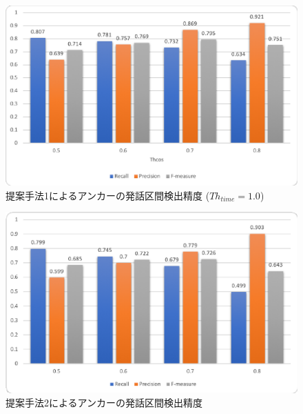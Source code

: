 \begin{figure}[H]
  \begin{center}
    \includegraphics[scale=0.8]{./figure/get_anchor_prob1.eps}
  \end{center}
  \caption{提案手法1によるアンカーの発話区間検出精度 ($Th_{time}=1.0$) \label{fig:result_anchor_prob1}}
\end{figure}

\begin{figure}[H]
  \begin{center}
    \includegraphics[scale=0.8]{./figure/get_anchor_prob2.eps}
  \end{center}
  \caption{提案手法2によるアンカーの発話区間検出精度 \label{fig:result_anchor_prob2}}
\end{figure}


